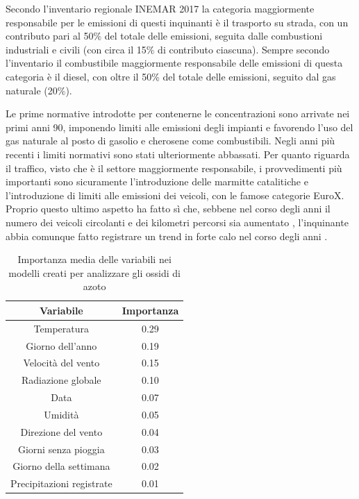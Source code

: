 \documentclass[a4paper]{report}
\begin{document}
Secondo l'inventario regionale INEMAR 2017 \cite{inemar2017} la categoria maggiormente responsabile per le emissioni di questi inquinanti è il trasporto su strada, con un contributo pari al 50\% del totale delle emissioni, seguita dalle combustioni industriali e civili (con circa il 15\% di contributo ciascuna). Sempre secondo l'inventario il combustibile maggiormente responsabile delle emissioni di questa categoria è il diesel, con oltre il 50\% del totale delle emissioni, seguito dal gas naturale (20\%).

Le prime normative introdotte per contenerne le concentrazioni sono arrivate nei primi anni 90, imponendo limiti alle emissioni degli impianti e favorendo l'uso del gas naturale al posto di gasolio e cherosene come combustibili. Negli anni più recenti i limiti normativi sono stati ulteriormente abbassati. Per quanto riguarda il traffico, visto che è il settore maggiormente responsabile, i provvedimenti più importanti sono sicuramente l'introduzione delle marmitte catalitiche e l'introduzione di limiti alle emissioni dei veicoli, con le famose categorie EuroX. Proprio questo ultimo aspetto ha fatto sì che, sebbene nel corso degli anni il numero dei veicoli circolanti e dei kilometri percorsi sia aumentato
, l'inquinante abbia comunque fatto registrare un trend in forte calo nel corso degli anni \cite{iir2020}.

\begin{table}[h!]
\centering
\begin{tabular}{ |c c| }
	\hline
	Variabile & Importanza \\
	\hline
	Temperatura & 0.29 \\
	Giorno dell'anno & 0.19 \\
	Velocità del vento & 0.15 \\
	Radiazione globale & 0.10 \\
	Data & 0.07 \\
	Umidità & 0.05 \\
	Direzione del vento & 0.04 \\
	Giorni senza pioggia & 0.03 \\
	Giorno della settimana & 0.02 \\
	Precipitazioni registrate & 0.01 \\
	\hline
\end{tabular}
\caption{Importanza media delle variabili nei modelli creati per analizzare gli ossidi di azoto}
\label{table:importanza_nox}
\end{table}
\end{document}
